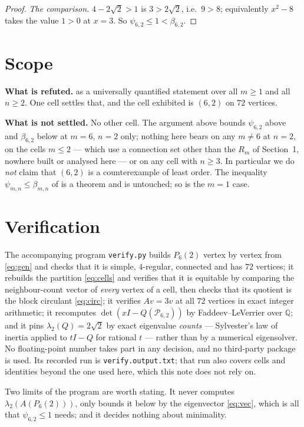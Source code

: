 \documentclass[11pt]{amsart}
\theoremstyle{remark}
\newcommand{\PP}{\mathcal P}
\newcommand{\lam}{\lambda}
\begin{document}
\begin{proof}
\emph{The comparison.} $4-2\sqrt2>1$ is $3>2\sqrt2$, i.e.\ $9>8$; equivalently $x^2-8$ takes
the value $1>0$ at $x=3$. So $\psi_{6,2}\le1<\beta_{6,2}$.
\end{proof}

\section{Scope}

\noindent\textbf{What is refuted.} \cite[Conjecture~2]{GZ} as a universally quantified
statement over all $m\ge1$ and all $n\ge2$. One cell settles that, and the cell exhibited is
$(6,2)$ on $72$ vertices.

\medskip
\noindent\textbf{What is not settled.} No other cell. The argument above bounds $\psi_{6,2}$
above and $\beta_{6,2}$ below at $m=6$, $n=2$ only; nothing here bears on any $m\ne6$ at
$n=2$, on the cells $m\le2$ --- which use a connection set other than the $R_m$ of
Section~1, nowhere built or analysed here --- or on any cell with $n\ge3$. In particular we do
\emph{not} claim that $(6,2)$ is a counterexample of least order. The inequality
$\psi_{m,n}\le\beta_{m,n}$ of \cite{Bl} is a theorem and is untouched; so is the $m=1$ case.

\section{Verification}

The accompanying program \texttt{verify.py} builds $P_6(2)$ vertex by vertex from
\eqref{eq:gen} and checks that it is simple, $4$-regular, connected and has $72$ vertices; it
rebuilds the partition \eqref{eq:cells} and verifies that it is equitable by comparing the
neighbour-count vector of \emph{every} vertex of a cell, then checks that its quotient is the
block circulant \eqref{eq:circ}; it verifies $Av=3v$ at all $72$ vertices in exact integer
arithmetic; it recomputes $\det(xI-Q(\PP_{6,2}))$ by Faddeev--LeVerrier over $\mathbb Q$; and
it pins $\lam_2(Q)=2\sqrt2$ by exact eigenvalue \emph{counts} --- Sylvester's law of inertia
applied to $tI-Q$ for rational $t$ --- rather than by a numerical eigensolver. No
floating-point number takes part in any decision, and no third-party package is used. Its
recorded run is \texttt{verify.output.txt}; that run also covers cells and identities beyond
the one used here, which this note does not rely on.

Two limits of the program are worth stating. It never computes $\lam_2(A(P_6(2)))$, only
bounds it below by the eigenvector \eqref{eq:vec}, which is all that $\psi_{6,2}\le1$ needs;
and it decides nothing about minimality.
\end{document}
